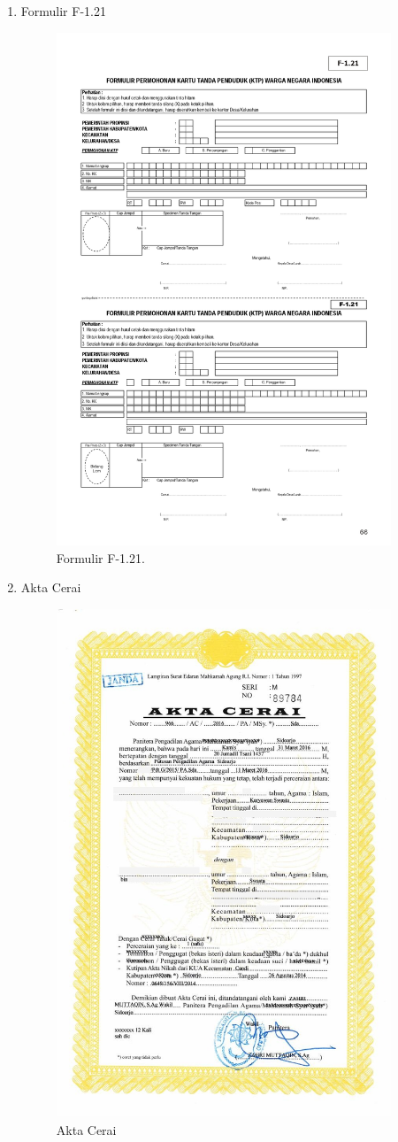 \begin{enumerate}
	\item Formulir F-1.21
	\begin{figure}[H]
		\centering
		\includegraphics[width=10cm]{figures/formulir.jpg}
		\caption{Formulir F-1.21.}	
	\end{figure}

	\item Akta Cerai
	\begin{figure}[H]
		\centering
		\includegraphics[width=10cm]{figures/aktacerai.jpg}
		\caption{Akta Cerai}	
	\end{figure}
\end{enumerate}